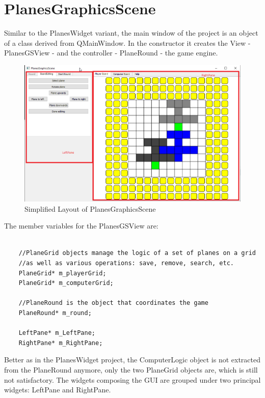 \section {PlanesGraphicsScene}

Similar to the PlanesWidget variant, the main window of the project is an object of a class derived from QMainWindow. In the constructor it creates the View - PlanesGSView - and the controller - PlaneRound - the game engine. 

\begin{figure}[h]
	\includegraphics[width = \textwidth]{PlanesGraphicsScene_BoardEditing_WidgetNames.png}
	\caption{Simplified Layout of PlanesGraphicsScene}
	\label{fig:planesgraphicsscene_boardediting_widgetnames}
\end{figure}

The member variables for the PlanesGSView are:

\begin{lstlisting}

	//PlaneGrid objects manage the logic of a set of planes on a grid
	//as well as various operations: save, remove, search, etc.
	PlaneGrid* m_playerGrid;
	PlaneGrid* m_computerGrid;
	
	//PlaneRound is the object that coordinates the game
	PlaneRound* m_round;
	
	LeftPane* m_LeftPane;
	RightPane* m_RightPane;

\end{lstlisting}

Better as in the PlanesWidget project, the ComputerLogic object is not extracted from the PlaneRound anymore, only the two PlaneGrid objects are, which is still not satisfactory. The widgets composing the GUI are grouped under two principal widgets: LeftPane and RightPane.

